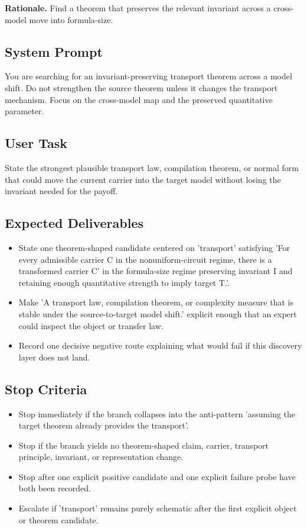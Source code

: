\documentclass[11pt]{article}
\begin{document}
\textbf{Rationale.} Find a theorem that preserves the relevant invariant across a cross-model move into formula-size.

\subsection*{System Prompt}
You are searching for an invariant-preserving transport theorem across a model shift. Do not strengthen the source theorem unless it changes the transport mechanism. Focus on the cross-model map and the preserved quantitative parameter.

\subsection*{User Task}
State the strongest plausible transport law, compilation theorem, or normal form that could move the current carrier into the target model without losing the invariant needed for the payoff.

\subsection*{Expected Deliverables}
\begin{itemize}[leftmargin=*,itemsep=0.2em]
\item State one theorem-shaped candidate centered on 'transport' satisfying 'For every admissible carrier C in the nonuniform-circuit regime, there is a transformed carrier C' in the formula-size regime preserving invariant I and retaining enough quantitative strength to imply target T.'.
\item Make 'A transport law, compilation theorem, or complexity measure that is stable under the source-to-target model shift.' explicit enough that an expert could inspect the object or transfer law.
\item Record one decisive negative route explaining what would fail if this discovery layer does not land.
\end{itemize}
\subsection*{Stop Criteria}
\begin{itemize}[leftmargin=*,itemsep=0.2em]
\item Stop immediately if the branch collapses into the anti-pattern 'assuming the target theorem already provides the transport'.
\item Stop if the branch yields no theorem-shaped claim, carrier, transport principle, invariant, or representation change.
\item Stop after one explicit positive candidate and one explicit failure probe have both been recorded.
\item Escalate if 'transport' remains purely schematic after the first explicit object or theorem candidate.
\end{itemize}
\end{document}
